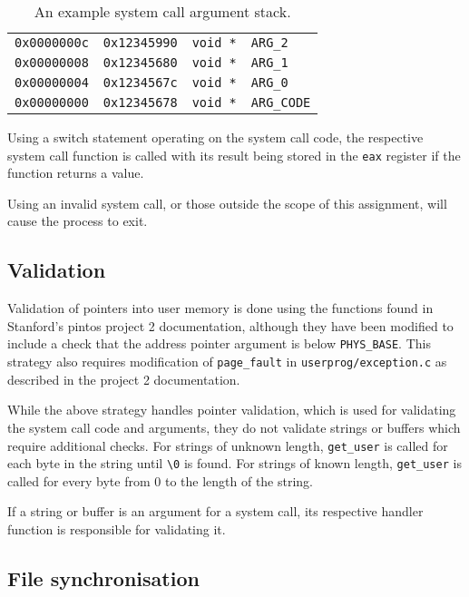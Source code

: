 \documentclass{article}
\begin{document}
\label{table:2}
\begin{table}[th]
    \centering
    \begin{tabular}{llll}
        \verb!0x0000000c! & \verb!0x12345990! & \verb!void *! & \verb!ARG_2! \\
        \verb!0x00000008! & \verb!0x12345680! & \verb!void *! & \verb!ARG_1! \\
        \verb!0x00000004! & \verb!0x1234567c! & \verb!void *! & \verb!ARG_0! \\
        \verb!0x00000000! & \verb!0x12345678! & \verb!void *! & \verb!ARG_CODE! \\
    \end{tabular}
    \caption{An example system call argument stack.}
\end{table}

Using a switch statement operating on the system call code, the respective system call function is called with its result being stored in the \verb!eax! register if the function returns a value.

Using an invalid system call, or those outside the scope of this assignment, will cause the process to exit.

\subsection{Validation}
\label{sec:validation}

Validation of pointers into user memory is done using the functions found in Stanford's pintos project 2 documentation, although they have been modified to include a check that the address pointer argument is below \verb!PHYS_BASE!. This strategy also requires modification of \verb!page_fault! in \verb!userprog/exception.c! as described in the project 2 documentation.

While the above strategy handles pointer validation, which is used for validating the system call code and arguments, they do not validate strings or buffers which require additional checks. For strings of unknown length, \verb!get_user! is called for each byte in the string until \verb!\0! is found. For strings of known length, \verb!get_user! is called for every byte from 0 to the length of the string.

If a string or buffer is an argument for a system call, its respective handler function is responsible for validating it.

\subsection{File synchronisation}
\label{sec:file-synchronisation}
\end{document}
